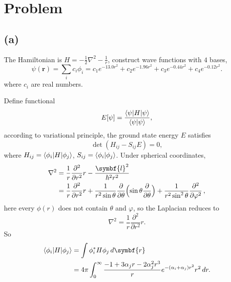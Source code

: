 \section{Problem }

\subsection*{(a)}

The Hamiltonian is $H = -\frac{1}{2} \nabla^2 - \frac{1}{r}$,
construct wave functions with $4$ bases,
%
\begin{equation}
    \psi(\symbf{r}) = \sum_{i} c_i \phi_i = c_1 e^{-13.0 r^2} +
    c_2 e^{-1.96 r^2} + c_3 e^{-0.44 r^2} + c_4 e^{-0.12 r^2}.
\end{equation}
%
where $c_i$ are real numbers.

Define functional
%
\begin{equation}
    E[\psi] = \frac{\braket{\psi| H | \psi}}{\braket{\psi|\psi}},
\end{equation}
%
according to variational principle, the ground state energy $E$ satisfies
%
\begin{equation}
    \det (H_{ij} - S_{ij} E) = 0,
\end{equation}
%
where $H_{ij} = \braket{\phi_i | H | \phi_j}$, $S_{ij} = \braket{\phi_i | \phi_j}$.
Under spherical coordinates,
%
\begin{equation}
    \begin{aligned}
        \nabla^2 & = \frac{1}{r} \frac{\partial^2}{\partial r^2} r - \frac{\symbf{l}^2}{\hbar^2 r^2} \\
                 & = \frac{1}{r} \frac{\partial^2}{\partial r^2}r +
        \frac{1}{r^{2}\sin \theta} \frac{\partial}{\partial \theta}
        \Bigl(\sin \theta{\frac{\partial}{\partial \theta}}\Bigr)+
        \frac{1}{r^{2}\sin^{2}\theta} \frac{\partial^{2}}{\partial \varphi^{2}} \,,
    \end{aligned}
\end{equation}
%
here every $\phi(r)$ does not contain $\theta$ and $\varphi$, so the Laplacian reduces to
%
\begin{equation}
    \nabla^2 = \frac{1}{r} \frac{\partial^2}{\partial r^2} r.
\end{equation}
%
So
%
\begin{equation}
    \begin{aligned}
        \braket{\phi_i | H | \phi_j} & = \int \phi_i^\ast H \phi_j \, d\symbf{r}                              \\
                                     & = 4\pi\int_{0}^{\infty} \frac{-1 + 3 \alpha_j r - 2 \alpha_j^2 r^3}{r}
        e^{-(\alpha_i + \alpha_j)r^2} r^2\, dr.
    \end{aligned}
\end{equation}
